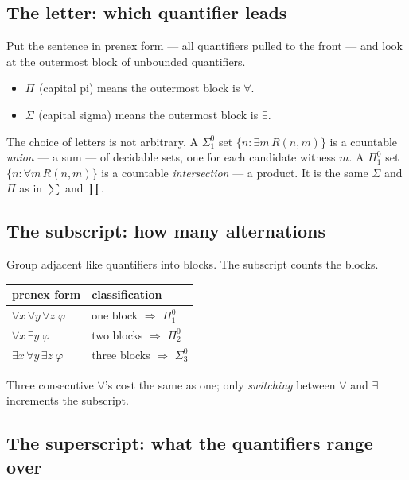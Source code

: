 \documentclass[11pt,a4paper]{article}
\newcommand{\Sig}[2]{\Sigma^{#1}_{#2}}
\newcommand{\Pai}[2]{\Pi^{#1}_{#2}}
\begin{document}
\subsection*{The letter: which quantifier leads}

Put the sentence in prenex form --- all quantifiers pulled to the front --- and
look at the outermost block of unbounded quantifiers.

\begin{itemize}
\item $\Pai{}{}$ (capital pi) means the outermost block is $\forall$.
\item $\Sig{}{}$ (capital sigma) means the outermost block is $\exists$.
\end{itemize}

The choice of letters is not arbitrary. A $\Sig{0}{1}$ set
$\{n : \exists m\, R(n,m)\}$ is a countable \emph{union} --- a sum --- of
decidable sets, one for each candidate witness $m$. A $\Pai{0}{1}$ set
$\{n : \forall m\, R(n,m)\}$ is a countable \emph{intersection} --- a product.
It is the same $\Sigma$ and $\Pi$ as in $\sum$ and $\prod$.

\subsection*{The subscript: how many alternations}

Group adjacent like quantifiers into blocks. The subscript counts the blocks.

\begin{center}
\begin{tabular}{@{}ll@{}}
\toprule
prenex form & classification \\
\midrule
$\forall x\, \forall y\, \forall z\; \varphi$ & one block $\Rightarrow$ $\Pai{0}{1}$ \\
$\forall x\, \exists y\; \varphi$ & two blocks $\Rightarrow$ $\Pai{0}{2}$ \\
$\exists x\, \forall y\, \exists z\; \varphi$ & three blocks $\Rightarrow$ $\Sig{0}{3}$ \\
\bottomrule
\end{tabular}
\end{center}

Three consecutive $\forall$'s cost the same as one; only \emph{switching}
between $\forall$ and $\exists$ increments the subscript.

\subsection*{The superscript: what the quantifiers range over}
\end{document}
